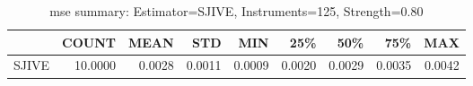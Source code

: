 \begin{table}[ht]
\centering
\caption{mse summary: Estimator=SJIVE, Instruments=125, Strength=0.80}
\begin{tabular}{lrrrrrrrr}
\toprule
 & COUNT & MEAN & STD & MIN & 25\% & 50\% & 75\% & MAX \\
\midrule
SJIVE & 10.0000 & 0.0028 & 0.0011 & 0.0009 & 0.0020 & 0.0029 & 0.0035 & 0.0042 \\
\bottomrule
\end{tabular}
\end{table}
